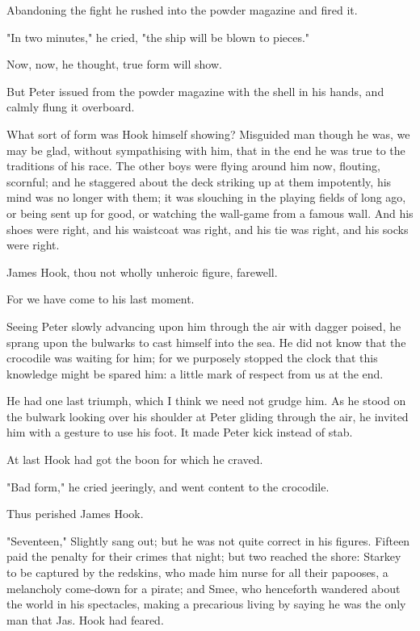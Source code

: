 Abandoning the fight he rushed into the powder magazine and fired it.


"In two minutes," he cried, "the ship will be blown to pieces."


Now, now, he thought, true form will show.


But Peter issued from the powder magazine with the shell in his hands, and
calmly flung it overboard.


What sort of form was Hook himself showing? Misguided man though he was,
we may be glad, without sympathising with him, that in the end he was true
to the traditions of his race. The other boys were flying around him now,
flouting, scornful; and he staggered about the deck striking up at them
impotently, his mind was no longer with them; it was slouching in the
playing fields of long ago, or being sent up for good,
or watching the wall-game from a famous wall. And his shoes were right,
and his waistcoat was right, and his tie was right, and his socks were
right.


James Hook, thou not wholly unheroic figure, farewell.


For we have come to his last moment.


Seeing Peter slowly advancing upon him through the air with dagger poised,
he sprang upon the bulwarks to cast himself into the sea. He did not know
that the crocodile was waiting for him; for we purposely stopped the clock
that this knowledge might be spared him: a little mark of respect from us
at the end.


He had one last triumph, which I think we need not grudge him. As he stood
on the bulwark looking over his shoulder at Peter gliding through the air,
he invited him with a gesture to use his foot. It made Peter kick instead
of stab.


At last Hook had got the boon for which he craved.


"Bad form," he cried jeeringly, and went content to the crocodile.


Thus perished James Hook.


"Seventeen," Slightly sang out; but he was not quite correct in his
figures. Fifteen paid the penalty for their crimes that night; but two
reached the shore: Starkey to be captured by the redskins, who made him
nurse for all their papooses, a melancholy come-down for a pirate; and
Smee, who henceforth wandered about the world in his spectacles, making a
precarious living by saying he was the only man that Jas. Hook had feared.


